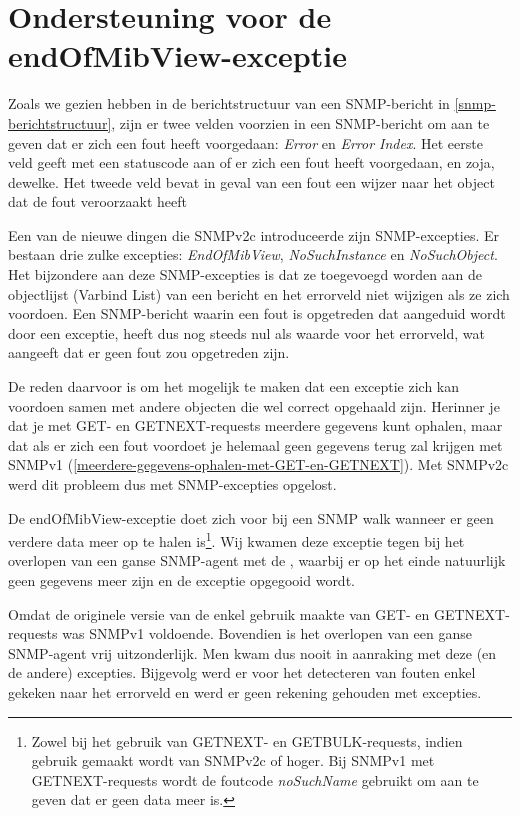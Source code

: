 \section{Ondersteuning voor de endOfMibView-exceptie}
\label{probleem-endofmibview-exceptie}

Zoals we gezien hebben in de berichtstructuur van een SNMP-bericht in \cref{snmp-berichtstructuur},
zijn er twee velden voorzien in een SNMP-bericht om aan te geven dat er zich een fout heeft voorgedaan: \textit{Error} en \textit{Error Index}.
Het eerste veld geeft met een statuscode aan of er zich een fout heeft voorgedaan, en zoja, dewelke.
Het tweede veld bevat in geval van een fout een wijzer naar het object dat de fout veroorzaakt heeft

Een van de nieuwe dingen die SNMPv2c introduceerde zijn SNMP-excepties.
Er bestaan drie zulke excepties: \textit{EndOfMibView}, \textit{NoSuchInstance} en \textit{NoSuchObject}.
Het bijzondere aan deze SNMP-excepties is dat ze toegevoegd worden aan de objectlijst (Varbind List) van een bericht
en het errorveld niet wijzigen als ze zich voordoen\cite{endOfMibView-error-status}.
Een SNMP-bericht waarin een fout is opgetreden dat aangeduid wordt door een exceptie, heeft dus nog steeds nul als waarde voor het errorveld,
wat aangeeft dat er geen fout zou opgetreden zijn.

De reden daarvoor is om het mogelijk te maken dat een exceptie zich kan voordoen samen met andere objecten die wel correct opgehaald zijn.
Herinner je dat je met GET- en GETNEXT-requests meerdere gegevens kunt ophalen,
maar dat als er zich een fout voordoet je helemaal geen gegevens terug zal krijgen met SNMPv1 (\cref{meerdere-gegevens-ophalen-met-GET-en-GETNEXT}).
Met SNMPv2c werd dit probleem dus met SNMP-excepties opgelost.

De endOfMibView-exceptie doet zich voor bij een SNMP walk wanneer er geen verdere data meer op te halen is\footnote{
	Zowel bij het gebruik van GETNEXT- en GETBULK-requests, indien gebruik gemaakt wordt van SNMPv2c of hoger.
	Bij SNMPv1 met GETNEXT-requests wordt de foutcode \textit{noSuchName} gebruikt om aan te geven dat er geen data meer is\cite{snmp-exceptions-v2c-to-v1}.
}\cite{snmp-exceptions-explained}.
Wij kwamen deze exceptie tegen bij het overlopen van een ganse SNMP-agent met de \nwmretriever{},
waarbij er op het einde natuurlijk geen gegevens meer zijn en de exceptie opgegooid wordt.

Omdat de originele versie van de \nwmretriever{} enkel gebruik maakte van GET- en GETNEXT-requests was SNMPv1 voldoende.
Bovendien is het overlopen van een ganse SNMP-agent vrij uitzonderlijk. Men kwam dus nooit in aanraking met deze (en de andere) excepties.
Bijgevolg werd er voor het detecteren van fouten enkel gekeken naar het errorveld en werd er geen rekening gehouden met excepties.

